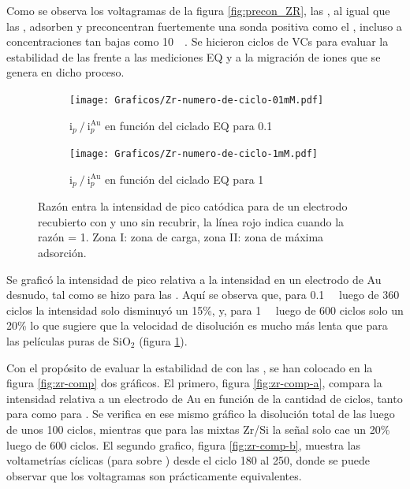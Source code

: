 		 Como se observa los voltagramas de la figura \ref{fig:precon_ZR}, las \pdmZ, al igual que las \pdmF, adsorben y preconcentran fuertemente una sonda positiva como el \ru,	incluso a concentraciones tan bajas como \SI{10}{\micro\Molar}. Se hicieron ciclos de VCs para evaluar la estabilidad de las \pdmZ\space frente a las mediciones EQ y a la migración de iones que se genera en dicho proceso. 

		 			\begin{figure}[h!]
			   	    \begin{subfigure}[t]{0.495\textwidth}
			        	\texttt{[image: Graficos/Zr-numero-de-ciclo-01mM.pdf]}
			        	\vspace*{-10mm}\caption{$\text{i}_p\mathbin{/}\text{i}_p^{\text{Au}}$ en función del ciclado EQ para \ru\space \SI{0.1}{\milli\Molar}}
			         	\end{subfigure}
			     		 \begin{subfigure}[t]{0.495\textwidth}
			        	\texttt{[image: Graficos/Zr-numero-de-ciclo-1mM.pdf]}
			        	\vspace*{-10mm}\caption{$\text{i}_p\mathbin{/}\text{i}_p^{\text{Au}}$ en función del ciclado EQ para \ru\space \SI{1}{\milli\Molar}}
			         	\end{subfigure}
			         	\caption[Intensidad en función del ciclado EQ para \pdmZ]{Razón entra la intensidad de pico catódica para \ru\space de un electrodo recubierto con \pdmZ\space y uno sin recubrir, la línea rojo indica cuando la razón = 1. Zona I: zona de carga, zona II: zona de máxima adsorción.}
			         	\label{fig:ventana-zr}
			     	\end{figure}

		 Se graficó la intensidad de pico relativa a la intensidad en un electrodo de Au desnudo, tal como se hizo para las \pdmF. Aquí se observa que, para \ru\space \SI{0.1}{\milli\Molar} luego de 360 ciclos la intensidad solo disminuyó un 15\%, y, para \ru\space \SI{1}{\milli\Molar} luego de 600 ciclos solo un 20\%  lo que sugiere que la velocidad de disolución es mucho más lenta que para las películas puras de SiO$_2$ (figura \ref{fig:ventana-zr}).
			     		
		 Con el propósito de evaluar la estabilidad de \pdmZ\space con las \pdmF, se han colocado en la figura \ref{fig:zr-comp} dos gráficos. El primero, figura \ref{fig:zr-comp-a}, compara la intensidad relativa a un electrodo de Au en función de la cantidad de ciclos, tanto para \pdmZ\space como para \pdmF. Se verifica en ese mismo gráfico la disolución total de las \pdmF\space luego de unos 100 ciclos, mientras que para las mixtas Zr/Si la señal solo cae un 20\% luego de 600 ciclos. El segundo grafico, figura \ref{fig:zr-comp-b}, muestra las voltametrías cíclicas (para \ru\space sobre \pdmZ) desde el ciclo 180 al 250, donde se puede observar que los voltagramas son prácticamente equivalentes.

